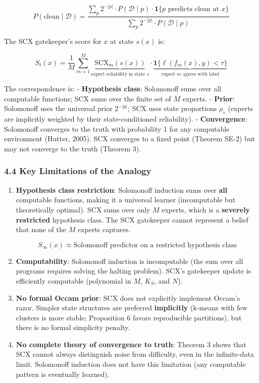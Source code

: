 \documentclass[
  12pt,
]{article}
\begin{document}
\[P(\text{clean} \mid \mathcal{D}) = \frac{\sum_p 2^{-|p|} \cdot P(\mathcal{D} \mid p) \cdot \mathbf{1}\{p \text{ predicts clean at } x\}}{\sum_p 2^{-|p|} \cdot P(\mathcal{D} \mid p)}\]

The SCX gatekeeper's score for \(x\) at state \(s(x)\) is:

\[S_t(x) = \frac{1}{M}\sum_{m=1}^M \underbrace{\text{SCX}_m(s(x))}_{\text{expert reliability in state } s} \cdot \underbrace{\mathbf{1}\{\ell(f_m(x), y) < \tau\}}_{\text{expert } m \text{ agrees with label}}\]

The correspondence is: - \textbf{Hypothesis class}: Solomonoff sums over
all computable functions; SCX sums over the finite set of \(M\) experts.
- \textbf{Prior}: Solomonoff uses the universal prior \(2^{-|p|}\); SCX
uses state proportions \(\rho_s\) (experts are implicitly weighted by
their state-conditioned reliability). - \textbf{Convergence}: Solomonoff
converges to the truth with probability 1 for any computable environment
(Hutter, 2005). SCX converges to a fixed point (Theorem SE-2) but may
not converge to the truth (Theorem 3).

\subsubsection{4.4 Key Limitations of the
Analogy}\label{key-limitations-of-the-analogy}

\begin{enumerate}
\def\labelenumi{\arabic{enumi}.}
\item
  \textbf{Hypothesis class restriction}: Solomonoff induction sums over
  \textbf{all} computable functions, making it a universal learner
  (incomputable but theoretically optimal). SCX sums over only \(M\)
  experts, which is a \textbf{severely restricted} hypothesis class. The
  SCX gatekeeper cannot represent a belief that none of the \(M\)
  experts captures.

  \[S_\infty(x) \approx \text{Solomonoff predictor on a restricted hypothesis class}\]
\item
  \textbf{Computability}: Solomonoff induction is incomputable (the sum
  over all programs requires solving the halting problem). SCX's
  gatekeeper update is efficiently computable (polynomial in \(M\),
  \(K_S\), and \(N\)).
\item
  \textbf{No formal Occam prior}: SCX does not explicitly implement
  Occam's razor. Simpler state structures are preferred
  \textbf{implicitly} (k-means with few clusters is more stable;
  Proposition 6 favors reproducible partitions), but there is no formal
  simplicity penalty.
\item
  \textbf{No complete theory of convergence to truth}: Theorem 3 shows
  that SCX cannot always distinguish noise from difficulty, even in the
  infinite-data limit. Solomonoff induction does not have this
  limitation (any computable pattern is eventually learned).
\end{enumerate}
\end{document}
